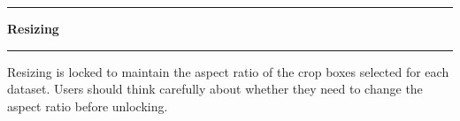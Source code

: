 \noindent\rule{\textwidth}{1pt}
\indent \textbf{Resizing}
\noindent\rule{\textwidth}{1pt}
\smallskip
\parbox{\textwidth}{Resizing is locked to maintain the aspect ratio of the crop boxes selected for each dataset. Users should think carefully about whether they need to change the aspect ratio before unlocking.}
\smallskip
